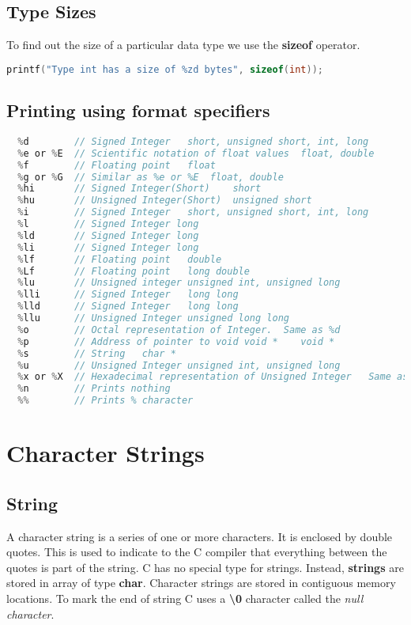 \documentclass[11pt,a4paper,oneside]{book}
\begin{document}
\section{Type Sizes}
To find out the size of a particular data type we use the \textbf{sizeof} operator.

\begin{lstlisting}[language=C]
  printf("Type int has a size of %zd bytes", sizeof(int));
\end{lstlisting}

\section{Printing using format specifiers}
\begin{lstlisting}[language=C, title=Print format specifiers]
  %c        // Character    char, unsigned char
  %d        // Signed Integer	short, unsigned short, int, long
  %e or %E  // Scientific notation of float values	float, double
  %f        // Floating point	float
  %g or %G  // Similar as %e or %E	float, double
  %hi       // Signed Integer(Short)	short
  %hu       // Unsigned Integer(Short)	unsigned short
  %i        // Signed Integer	short, unsigned short, int, long
  %l        // Signed Integer long
  %ld       // Signed Integer long
  %li       // Signed Integer long
  %lf       // Floating point	double
  %Lf       // Floating point	long double
  %lu       // Unsigned integer	unsigned int, unsigned long
  %lli      // Signed Integer	long long
  %lld      // Signed Integer	long long
  %llu      // Unsigned Integer	unsigned long long
  %o        // Octal representation of Integer.	 Same as %d
  %p        // Address of pointer to void void *	void *
  %s        // String	char *
  %u        // Unsigned Integer	unsigned int, unsigned long
  %x or %X  // Hexadecimal representation of Unsigned Integer	Same as %d
  %n        // Prints nothing	
  %%        // Prints % character
\end{lstlisting}

\chapter{Character Strings}
\section{String}
A character string is a series of one or more characters. It is enclosed by double quotes. This
is used to indicate to the C compiler that everything between the quotes is part of the string. C has
no special type for strings. Instead, \textbf{strings} are stored in array of type \textbf{char}.
Character strings are stored in contiguous memory locations. To mark the end of string C uses a
\textbf{\textbackslash0} character called the \textit{null character}.
\end{document}
